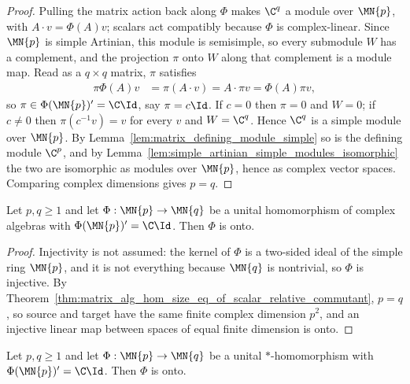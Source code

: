 \begin{proof}
    \leanok
    Pulling the matrix action back along $\Phi$ makes $\C^q$ a module over
    $\MN{p}$, with $A\cdot v=\Phi(A)v$; scalars act compatibly because $\Phi$
    is complex-linear. Since $\MN{p}$ is simple Artinian, this module is
    semisimple, so every submodule $W$ has a complement, and the projection
    $\pi$ onto $W$ along that complement is a module map. Read as a $q\times q$
    matrix, $\pi$ satisfies
    \begin{align}
        \pi\Phi(A)v
        &=\pi(A\cdot v)
          =A\cdot\pi v
          =\Phi(A)\pi v,
        \label{eq:spectral_projection_commutes}
    \end{align}
    so $\pi\in\Phi(\MN{p})'=\C\Id$, say $\pi=c\Id$. If $c=0$ then $\pi=0$ and
    $W=0$; if $c\neq0$ then $\pi(c^{-1}v)=v$ for every $v$ and $W=\C^q$. Hence
    $\C^q$ is a simple module over $\MN{p}$. By
    Lemma~\ref{lem:matrix_defining_module_simple} so is the defining module
    $\C^p$, and by
    Lemma~\ref{lem:simple_artinian_simple_modules_isomorphic} the two are
    isomorphic as modules over $\MN{p}$, hence as complex vector spaces.
    Comparing complex dimensions gives $p=q$.
\end{proof}

\begin{theorem}%
    \label{thm:matrix_alg_hom_surjective_of_scalar_relative_commutant}
    \leanok
    Let $p,q\geq1$ and let $\Phi:\MN{p}\to\MN{q}$ be a unital homomorphism of
    complex algebras with $\Phi(\MN{p})'=\C\Id$. Then $\Phi$ is onto.
\end{theorem}

\begin{proof}
    \leanok
    Injectivity is not assumed: the kernel of $\Phi$ is a two-sided ideal of
    the simple ring $\MN{p}$, and it is not everything because $\MN{q}$ is
    nontrivial, so $\Phi$ is injective. By
    Theorem~\ref{thm:matrix_alg_hom_size_eq_of_scalar_relative_commutant},
    $p=q$, so source and target have the same finite complex dimension $p^2$,
    and an injective linear map between spaces of equal finite dimension is
    onto.
\end{proof}

\begin{corollary}%
    \label{cor:matrix_star_alg_hom_surjective_of_scalar_relative_commutant}
    \leanok
    Let $p,q\geq1$ and let $\Phi:\MN{p}\to\MN{q}$ be a unital
    $*$-homomorphism with $\Phi(\MN{p})'=\C\Id$. Then $\Phi$ is onto.
\end{corollary}

